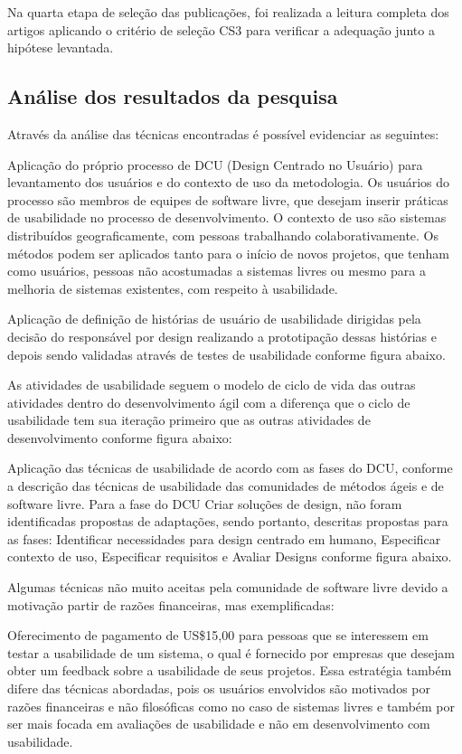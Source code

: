 \documentclass[12pt]{article}
\begin{document}
%
Na quarta etapa de seleção das publicações, foi realizada a leitura completa dos artigos aplicando o critério de seleção CS3 para verificar a adequação junto a hipótese levantada.

\subsection{Análise dos resultados da pesquisa}
Através da análise das técnicas encontradas é possível evidenciar as seguintes:

%
Aplicação do próprio processo de DCU (Design Centrado no Usuário) para levantamento dos usuários e do contexto de uso da metodologia. Os usuários do processo são membros de equipes de software livre, que desejam inserir práticas de usabilidade no processo de desenvolvimento. O contexto de uso são sistemas distribuídos geograficamente, com pessoas trabalhando colaborativamente. Os métodos podem ser aplicados tanto para o início de novos projetos, que tenham como usuários, pessoas não acostumadas a sistemas livres ou mesmo para a melhoria de sistemas existentes, com respeito à usabilidade.

%
Aplicação de definição de histórias de usuário de usabilidade dirigidas pela decisão do responsável por design realizando a prototipação dessas histórias e depois sendo validadas através de testes de usabilidade conforme figura abaixo.

%
As atividades de usabilidade seguem o modelo de ciclo de vida das outras atividades dentro do desenvolvimento ágil com a diferença que o ciclo de usabilidade tem sua iteração primeiro que as outras atividades de desenvolvimento conforme figura abaixo:

%
Aplicação das técnicas de usabilidade de acordo com as fases do DCU, conforme a descrição das técnicas de usabilidade das comunidades de métodos ágeis e de software livre. Para a fase do DCU Criar soluções de design, não foram identificadas propostas de adaptações, sendo portanto, descritas propostas para as fases: Identificar necessidades para design centrado em humano, Especificar contexto de uso, Especificar requisitos e Avaliar Designs conforme figura abaixo.

%
Algumas técnicas não muito aceitas pela comunidade de software livre devido a motivação partir de razões financeiras, mas exemplificadas:

%
Oferecimento de pagamento de US\$15,00 para pessoas que se interessem em testar a usabilidade de um sistema, o qual é fornecido por empresas que desejam obter um feedback sobre a usabilidade de seus projetos. Essa estratégia também difere das técnicas abordadas, pois os usuários envolvidos são motivados por razões financeiras e não filosóficas como no caso de sistemas livres e também por ser mais focada em avaliações de usabilidade e não em desenvolvimento com usabilidade.
\end{document}
